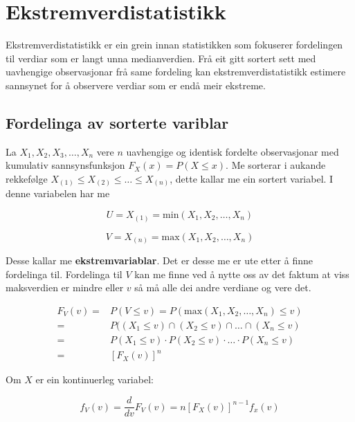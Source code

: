 \chapter{Ekstremverdistatistikk}
Ekstremverdistatistikk er ein grein innan statistikken som fokuserer fordelingen til verdiar som er langt unna medianverdien. Frå eit gitt sortert sett med uavhengige observasjonar frå same fordeling kan ekstremverdistatistikk estimere sannsynet for å observere verdiar som er endå meir ekstreme.

\section{Fordelinga av sorterte variblar}
La $X_1, X_2, X_3, \dots, X_n$ vere $n$ uavhengige og identisk fordelte observasjonar med kumulativ sannsynsfunksjon $F_X(x) = P(X \leq x)$. Me sorterar i aukande rekkefølge $X_{(1)} \leq X_{(2)} \leq \dots \leq X_{(n)}$, dette kallar me ein sortert variabel. I denne variabelen har me

\begin{equation*}
    U = X_{(1)} = \text{min}(X_1, X_2, \dots, X_n)
\end{equation*}

\begin{equation*}
    V = X_{(n)} = \text{max}(X_1, X_2, \dots, X_n)
\end{equation*}

Desse kallar me \textbf{ekstremvariablar}. Det er desse me er ute etter å finne fordelinga til. Fordelinga til $V$ kan me finne ved å nytte oss av det faktum at viss maksverdien er mindre eller $v$ så må alle dei andre verdiane og vere det.

\begin{equation}
\begin{aligned}
    F_V(v) = & P(V \leq v) = P(\text{max}(X_1, X_2, \dots, X_n) \leq v) \\
       = & P((X_1 \leq v) \cap (X_2 \leq v) \cap \dots \cap (X_n \leq v) \\
       = & P(X_1 \leq v) \cdot P(X_2 \leq v) \cdot \dots \cdot P(X_n \leq v) \\
       = & [F_X(v)]^n
\end{aligned}
\end{equation}

Om $X$ er ein kontinuerleg variabel:

\begin{equation}
    f_V(v) = \frac{d}{dv} F_V(v) = n[F_X(v)]^{n-1}f_x(v)
\end{equation}

